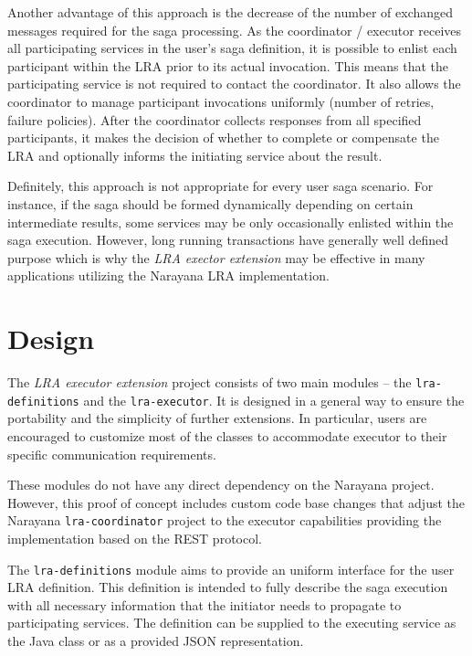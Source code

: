 \documentclass[oneside,
  digital, %
  table,   %
  lof,     %
  lot,     %
]{fithesis3}
\begin{document}
Another advantage of this approach is the decrease of the number of exchanged messages required for the saga processing. As the coordinator / executor receives all participating services in the user's saga definition, it is possible to enlist each participant within the LRA prior to its actual invocation. This means that the participating service is not required to contact the coordinator. It also allows the coordinator to manage participant invocations uniformly (number of retries, failure policies). After the coordinator collects responses from all specified participants, it makes the decision of whether to complete or compensate the LRA and optionally informs the initiating service about the result.

Definitely, this approach is not appropriate for every user saga scenario. For instance, if the saga should be formed dynamically depending on certain intermediate results, some services may be only occasionally enlisted within the saga execution. However, long running transactions have generally well defined purpose which is why the \textit{LRA exector extension} may be effective in many applications utilizing the Narayana LRA implementation.

\section{Design}
\label{sec:extension-design}

The \textit{LRA executor extension} project consists of two main modules -- the \texttt{lra-definitions} and the \texttt{lra-executor}. It is designed in a general way to ensure the portability and the simplicity of further extensions. In particular, users are encouraged to customize most of the classes to accommodate executor to their specific communication requirements.

These modules do not have any direct dependency on the Narayana project. However, this proof of concept includes custom code base changes that adjust the Narayana \texttt{lra-coordinator} project to the executor capabilities providing the implementation based on the REST protocol.

The \texttt{lra-definitions} module aims to provide an uniform interface for the user LRA definition. This definition is intended to fully describe the saga execution with all necessary information that the initiator needs to propagate to participating services. The definition can be supplied to the executing service as the Java class or as a provided JSON representation.
\end{document}

